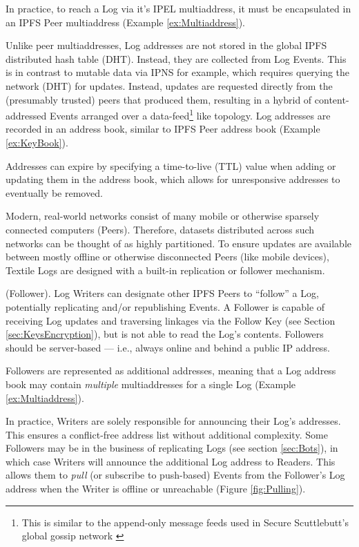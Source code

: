 \documentclass{textile}
\begin{document}
In practice, to reach a Log via it's IPEL multiaddress, it must be encapsulated in an IPFS Peer multiaddress (Example \ref{ex:Multiaddress}).

Unlike peer multiaddresses, Log addresses are not stored in the global IPFS distributed hash table \cite{benetIPFSContentAddressed2014} (DHT). Instead, they are collected from Log Events. This is in contrast to mutable data via IPNS for example, which requires querying the network (DHT) for updates. Instead, updates are requested directly from the (presumably trusted) peers that produced them, resulting in a hybrid of content-addressed Events arranged over a data-feed\footnote{This is similar to the append-only message feeds used in Secure Scuttlebutt’s global gossip network \cite{ScuttlebuttProtocolGuide}} like topology. Log addresses are recorded in an address book, similar to IPFS Peer address book (Example \ref{ex:KeyBook}).

Addresses can expire by specifying a time-to-live (TTL) value when adding or updating them in the address book, which allows for unresponsive addresses to eventually be removed.

Modern, real-world networks consist of many mobile or otherwise sparsely connected computers (Peers). Therefore, datasets distributed across such networks can be thought of as highly partitioned. To ensure updates are available between mostly offline or otherwise disconnected Peers (like mobile devices), Textile Logs are designed with a built-in replication or follower mechanism.

\begin{definition} (Follower). Log Writers can designate other IPFS Peers to ``follow'' a Log, potentially replicating and/or republishing Events. A Follower is capable of receiving Log updates and traversing linkages via the Follow Key (see Section  \ref{sec:KeysEncryption}), but is not able to read the Log's contents. Followers should be server-based --- i.e., always online and behind a public IP address.\end{definition}

Followers are represented as additional addresses, meaning that a Log address book may contain \emph{multiple} multiaddresses for a single Log (Example \ref{ex:Multiaddress}).

In practice, Writers are solely responsible for announcing their Log's addresses. This ensures a conflict-free address list without additional complexity. Some Followers may be in the business of replicating Logs (see section  \ref{sec:Bots}), in which case Writers will announce the additional Log address to Readers. This allows them to \emph{pull} (or subscribe to push-based) Events from the Follower's Log address when the Writer is offline or unreachable (Figure \ref{fig:Pulling}).
\end{document}
